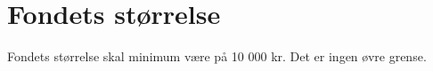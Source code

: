 \section{Fondets størrelse}
Fondets størrelse skal minimum være på 10 000 kr. Det er ingen øvre grense.
